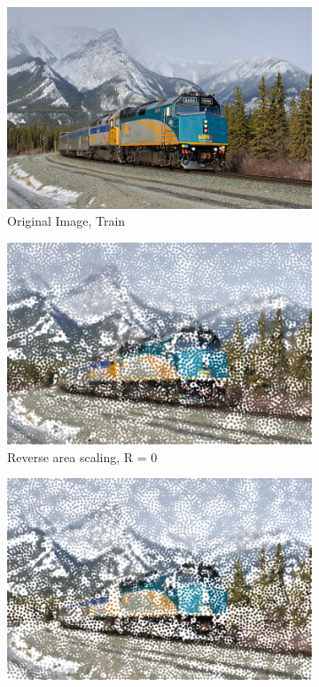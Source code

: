 \documentclass[11pt]{article}
\begin{document}
\begin{figure}[H]
	\centering
	\begin{subfigure}[b]{.48\linewidth}
		\includegraphics[width=\linewidth]{Train-Canada}
		\caption{Original Image, Train}
		\label{fig:train}
	\end{subfigure}
	\begin{subfigure}[b]{.48\linewidth}
		\includegraphics[width=\linewidth]{Train-Canada-8000-1}
		\caption{Reverse area scaling, R = 0}
		\label{fig:train1}
	\end{subfigure}
	\begin{subfigure}[b]{.48\linewidth}
		\includegraphics[width=\linewidth]{Train-Canada-8000-2}

\end{subfigure}
\end{figure}
\end{document}
